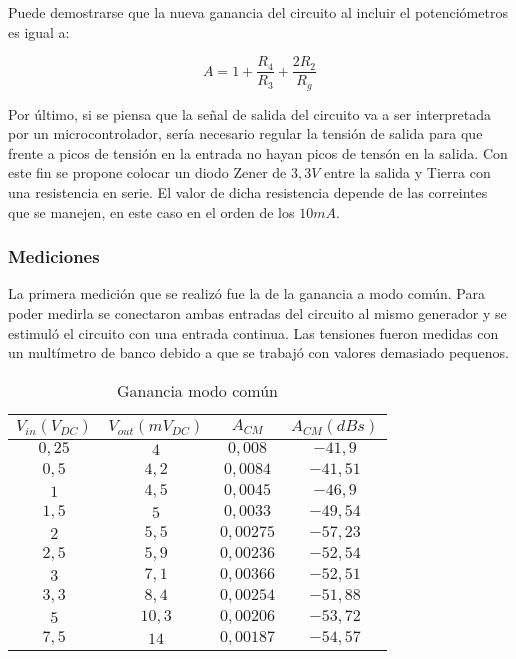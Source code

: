 Puede demostrarse que la nueva ganancia del circuito al incluir el potenciómetros es igual a:

\begin{equation}
\boxed{A = 1 + \frac{R_4}{R_3} + \frac{2R_2}{R_g}}
\end{equation}

Por \'ultimo, si se piensa que la señal de salida del circuito va a ser interpretada por un microcontrolador, ser\'ia necesario regular la tensi\'on de salida para que frente a picos de tensi\'on en la entrada no hayan picos de tens\'on en la salida. Con este fin se propone colocar un diodo Zener de $3,3V$ entre la salida y Tierra con una resistencia en serie. El valor de dicha resistencia depende de las correintes que se manejen, en este caso en el orden de los $10mA$.


\subsubsection{Mediciones}
La primera medici\'on que se realiz\'o fue la de la ganancia a modo com\'un. Para poder medirla se conectaron ambas entradas del circuito al mismo generador y se estimul\'o el circuito con una entrada continua. Las tensiones fueron medidas con un mult\'imetro de banco debido a que se trabaj\'o con valores demasiado pequenos.


\begin{table}[H]
\centering
\begin{tabular}{cccc}\hline
$V_{in}(V_{DC})$ & $V_{out}(mV_{DC})$ & $A_{CM}$ & $A_{CM} (dBs)$ \\
\hline
$0,25$ & $4$ & $0,008$ & $-41,9$ \\
$0,5$   & $4,2$  & $0,0084$ & $-41,51$ \\
$1$  & $4,5$ & $0,0045$ & $-46,9$\\
$1,5$  & $5$ & $0,0033$ & $-49,54$\\
$2$  & $5,5$ & $0,00275$ & $-57,23$\\
$2,5$  & $5,9$ & $0,00236$ & $-52,54$\\
$3$  & $7,1$ & $0,00366$ & $-52,51$\\
$3,3$  & $8,4$ & $0,00254$ & $-51,88$\\
$5$  & $10,3$ & $0,00206$ & $-53,72$\\
$7,5$  & $14$ & $0,00187$ & $-54,57$\\ \hline
\end{tabular}
\caption{Ganancia modo com\'un}
\label{table:ganancia_comun}
\end{table}


